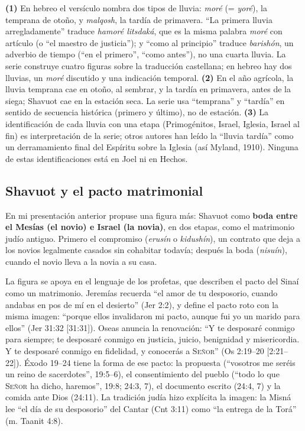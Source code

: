 \documentclass[11pt,letterpaper]{article}
\newcommand{\SENOR}{\textsc{Señor}}
\newcommand{\destacar}[1]{\textbf{\textcolor{tierraroja}{#1}}}
\begin{document}
\begin{nota}
\textbf{(1)} En hebreo el versículo nombra dos tipos de lluvia: \emph{moré} (= \emph{yoré}), la temprana de otoño, y \emph{malqosh}, la tardía de primavera. ``La primera lluvia arregladamente'' traduce \emph{hamoré litsdaká}, que es la misma palabra \emph{moré} con artículo (o ``el maestro de justicia''); y ``como al principio'' traduce \emph{barishón}, un adverbio de tiempo (``en el primero'', ``como antes''), no una cuarta lluvia. La serie construye cuatro figuras sobre la traducción castellana; en hebreo hay dos lluvias, un \emph{moré} discutido y una indicación temporal. \textbf{(2)} En el año agrícola, la lluvia temprana cae en otoño, al sembrar, y la tardía en primavera, antes de la siega; Shavuot cae en la estación seca. La serie usa ``temprana'' y ``tardía'' en sentido de secuencia histórica (primero y último), no de estación. \textbf{(3)} La identificación de cada lluvia con una etapa (Primogénitos, Israel, Iglesia, Israel al fin) es interpretación de la serie; otros autores han leído la ``lluvia tardía'' como un derramamiento final del Espíritu sobre la Iglesia (así Myland, 1910). Ninguna de estas identificaciones está en Joel ni en Hechos.
\end{nota}

\subsection{Shavuot y el pacto matrimonial}

En mi presentación anterior propuse una figura más: Shavuot como \destacar{boda entre el Mesías (el novio) e Israel (la novia)}, en dos etapas, como el matrimonio judío antiguo. Primero el compromiso (\emph{erusín} o \emph{kidushín}), un contrato que deja a los novios legalmente casados sin cohabitar todavía; después la boda (\emph{nisuín}), cuando el novio lleva a la novia a su casa.

La figura se apoya en el lenguaje de los profetas, que describen el pacto del Sinaí como un matrimonio. Jeremías recuerda ``el amor de tu desposorio, cuando andabas en pos de mí en el desierto'' (Jer 2:2), y define el pacto roto con la misma imagen: ``porque ellos invalidaron mi pacto, aunque fui yo un marido para ellos'' (Jer 31:32 [31:31]). Oseas anuncia la renovación: ``Y te desposaré conmigo para siempre; te desposaré conmigo en justicia, juicio, benignidad y misericordia. Y te desposaré conmigo en fidelidad, y conocerás a \SENOR'' (Os 2:19--20 [2:21--22]). Éxodo 19--24 tiene la forma de ese pacto: la propuesta (``vosotros me seréis un reino de sacerdotes'', 19:5--6), el consentimiento del pueblo (``todo lo que \SENOR{} ha dicho, haremos'', 19:8; 24:3, 7), el documento escrito (24:4, 7) y la comida ante Dios (24:11). La tradición judía hizo explícita la imagen: la Misná lee ``el día de su desposorio'' del Cantar (Cnt 3:11) como ``la entrega de la Torá'' (m. Taanit 4:8).
\end{document}
